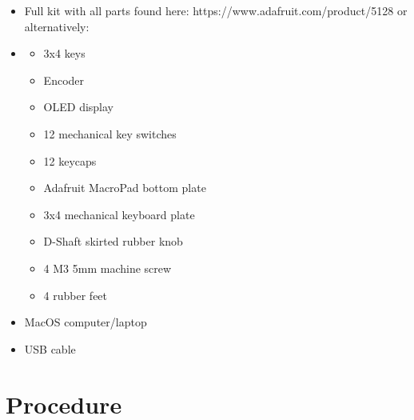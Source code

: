\documentclass{article}
\begin{document}
\begin{itemize}
    \item Full kit with all parts found here: https://www.adafruit.com/product/5128 or alternatively:
    \item
        \begin{itemize}
            \item 3x4 keys
            \item Encoder
            \item OLED display
            \item 12 mechanical key switches
            \item 12 keycaps
            \item Adafruit MacroPad bottom plate
            \item 3x4 mechanical keyboard plate
            \item D-Shaft skirted rubber knob
            \item 4 M3 5mm machine screw
            \item 4 rubber feet
        \end{itemize}
    \item MacOS computer/laptop
    \item USB cable
\end{itemize}

\newpage
\section{Procedure}
\end{document}
